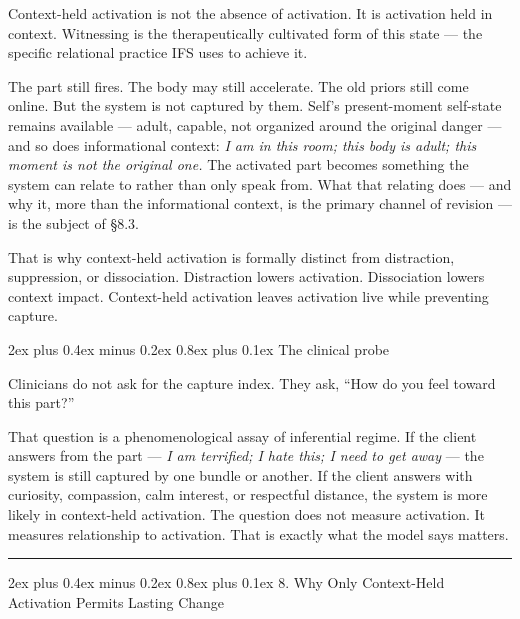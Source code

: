 \documentclass[12pt,a4paper]{article}
\makeatletter
\renewcommand\subsection{\@startsection{subsection}{2}{0pt}%
  {2ex plus 0.4ex minus 0.2ex}%
  {0.8ex plus 0.1ex}%
  {\normalsize\itshape}}
\makeatother
\begin{document}
Context-held activation is not the absence of activation. It is
activation held in context. Witnessing is the therapeutically cultivated
form of this state --- the specific relational practice IFS uses to
achieve it.

The part still fires. The body may still accelerate. The old priors
still come online. But the system is not captured by them. Self's
present-moment self-state remains available --- adult, capable, not
organized around the original danger --- and so does informational
context: \emph{I am in this room; this body is adult; this moment is not
the original one.} The activated part becomes something the system can
relate to rather than only speak from. What that relating does --- and
why it, more than the informational context, is the primary channel of
revision --- is the subject of §8.3.

That is why context-held activation is formally distinct from
distraction, suppression, or dissociation. Distraction lowers
activation. Dissociation lowers context impact. Context-held activation
leaves activation live while preventing capture.

\subsection{The clinical probe}\label{the-clinical-probe}

Clinicians do not ask for the capture index. They ask, ``How do you feel
toward this part?''

That question is a phenomenological assay of inferential regime. If the
client answers from the part --- \emph{I am terrified; I hate this; I
need to get away} --- the system is still captured by one bundle or
another. If the client answers with curiosity, compassion, calm
interest, or respectful distance, the system is more likely in
context-held activation. The question does not measure activation. It
measures relationship to activation. That is exactly what the model says
matters.

\begin{center}\rule{0.5\linewidth}{0.5pt}\end{center}

\subsection{8. Why Only Context-Held Activation Permits Lasting
Change}\label{why-only-context-held-activation-permits-lasting-change}
\end{document}
